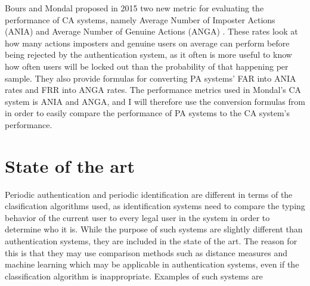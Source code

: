 \documentclass[informationsecurity]{gucmasterproject}
\begin{document}
Bours and Mondal proposed in 2015 two new metric for evaluating the performance of CA systems, namely Average Number of Imposter Actions (ANIA) and Average Number of Genuine Actions (ANGA) \cite{CA-performance}.
These rates look at how many actions imposters and genuine users on average can perform before being rejected by the authentication system, as it often is more useful to know how often users will be locked out than the probability of that happening per sample.
They also provide formulas for converting PA systems' FAR into ANIA rates and FRR into ANGA rates.
The performance metrics used in Mondal's \cite{mondal} CA system is ANIA and ANGA, and I will therefore use the conversion formulas from \cite{CA-performance} in order to easily compare the performance of PA systems to the CA system's performance.




%



\chapter{State of the art}
\label{chap:state}
Periodic authentication and periodic identification are different in terms of the clasification algorithms used, as identification systems need to compare the typing behavior of the current user to every legal user in the system in order to determine who it is.
While the purpose of such systems are slightly different than authentication systems, they are included in the state of the art.
The reason for this is that they may use comparison methods such as distance measures and machine learning which may be applicable in authentication systems, even if the classification algorithm is inappropriate.
Examples of such systems are 
\end{document}
